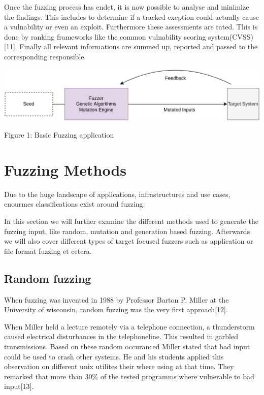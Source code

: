 \documentclass[journal=tosc,final]{iacrtrans}
\begin{document}
Once the fuzzing process has endet, it is now possible to analyse and minimize the findings. This includes to determine if a tracked exeption could actually cause a vulnability or even an exploit. Furthermore these assessments are rated. This is done by ranking frameworks like the common vulnability scoring system(CVSS)[11]. Finally all relevant informations are summed up, reported and passed to the corresponding responsible. 
\begin{shaded}

\begin{center}
\includegraphics[scale=0.2]{../final2.png}

\vspace{2mm} Figure 1: Basic Fuzzing application
\end{center}
\end{shaded}


\section{Fuzzing Methods}
Due to the huge landscape of applications, infrastructures and use cases, enourmes classifications exist around fuzzing. 

In this section we will further examine the different methods used to generate the fuzzing input, like random, mutation and generation based fuzzing. Afterwards we will also cover different types of target focused fuzzers such as application or file format fuzzing et cetera. 
\subsection{Random fuzzing}
When fuzzing was invented in 1988 by Professor Barton P. Miller at the University of wisconsin, random fuzzing was the very first approach[12].

When Miller held a lecture remotely via a telephone connection, a thunderstorm caused electrical disturbances in the telephoneline. This resulted in garbled transmissions. Based on these random occuranced Miller stated that bad input  could be used to crash other systems. He and his students applied this observation on different unix utilites their where using at that time. They remarked that  more than 30\% of the tested programms where vulnerable to bad input[13]. 
\end{document}
